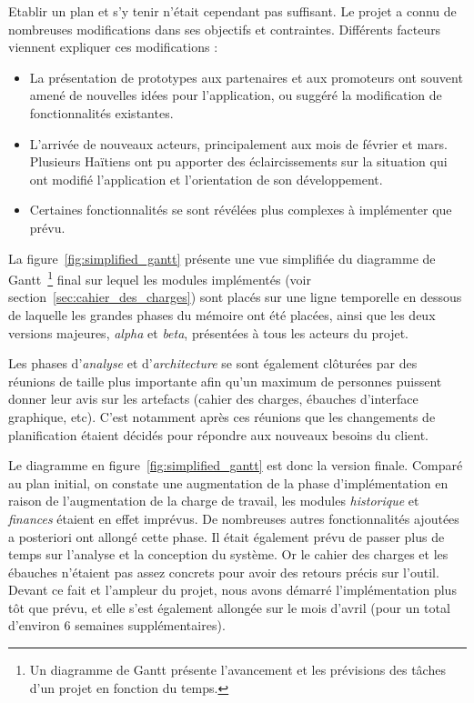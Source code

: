 \documentclass{EPL-master-thesis-covers-FR}
\begin{document}
				Etablir un plan et s'y tenir n'était cependant pas suffisant. Le projet a connu de nombreuses modifications dans ses objectifs et contraintes. Différents facteurs viennent expliquer ces modifications :

				\begin{itemize}
					\item La présentation de prototypes aux partenaires et aux promoteurs ont souvent amené de nouvelles idées pour l'application, ou suggéré la modification de fonctionnalités existantes.
					\item L'arrivée de nouveaux acteurs, principalement aux mois de février et mars. Plusieurs Haïtiens ont pu apporter des éclaircissements sur la situation qui ont modifié l'application et l'orientation de son développement.
					\item Certaines fonctionnalités se sont révélées plus complexes à implémenter que prévu.
				\end{itemize}

				La figure~\ref{fig:simplified_gantt} présente une vue simplifiée du diagramme de Gantt~\footnote{Un diagramme de Gantt présente l'avancement et les prévisions des tâches d'un projet en fonction du temps.} final sur lequel les modules implémentés (voir section~\ref{sec:cahier_des_charges}) sont placés sur une ligne temporelle en dessous de laquelle les grandes phases du mémoire ont été placées, ainsi que les deux versions majeures, \emph{alpha} et \emph{beta}, présentées à tous les acteurs du projet.

				Les phases d'\emph{analyse} et d'\emph{architecture} se sont également clôturées par des réunions de taille plus importante afin qu'un maximum de personnes puissent donner leur avis sur les artefacts (cahier des charges, ébauches d'interface graphique, etc). C'est notamment après ces réunions que les changements de planification étaient décidés pour répondre aux nouveaux besoins du client.

				Le diagramme en figure~\ref{fig:simplified_gantt} est donc la version finale. Comparé au plan initial, on constate une augmentation de la phase d'implémentation en raison de l'augmentation de la charge de travail, les modules \emph{historique} et \emph{finances} étaient en effet imprévus. De nombreuses autres fonctionnalités ajoutées a posteriori ont allongé cette phase.
				Il était également prévu de passer plus de temps sur l'analyse et la conception du système. Or le cahier des charges et les ébauches n'étaient pas assez concrets pour avoir des retours précis sur l'outil. Devant ce fait et l'ampleur du projet, nous avons démarré l'implémentation plus tôt que prévu, et elle s'est également allongée sur le mois d'avril (pour un total d'environ 6 semaines supplémentaires).
\end{document}
